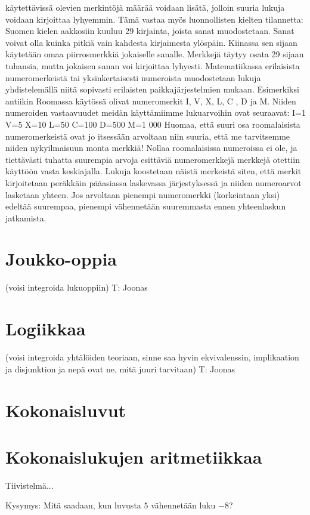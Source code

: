 käytettävissä olevien merkintöjä määrää voidaan lisätä, jolloin suuria lukuja voidaan kirjoittaa lyhyemmin. Tämä vastaa myös luonnollisten kielten tilannetta: Suomen kielen aakkosiin kuuluu 29 kirjainta, joista sanat muodostetaan. Sanat voivat olla kuinka pitkiä vain kahdesta kirjaimesta ylöspäin. Kiinassa sen sijaan käytetään omaa piirrosmerkkiä jokaiselle sanalle. Merkkejä täytyy osata 29 sijaan tuhansia, mutta jokaisen sanan voi kirjoittaa lyhyesti. 
Matematiikassa erilaisista numeromerkeistä tai yksinkertaisesti numeroista muodostetaan lukuja yhdistelemällä niitä sopivasti erilaisten paikkajärjestelmien mukaan. Esimerkiksi antiikin Roomassa käytössä olivat numeromerkit I, V, X, L, C , D ja M. Niiden numeroiden vastaavuudet meidän käyttämiimme lukuarvoihin ovat seuraavat:
I=1
V=5
X=10
L=50
C=100
D=500
M=1 000
Huomaa, että suuri osa roomalaisista numeromerkeistä ovat jo itsessään arvoltaan niin suuria, että me tarvitsemme niiden nykyilmaisuun monta merkkiä! Nollaa roomalaisissa numeroissa ei ole, ja tiettävästi tuhatta suurempia arvoja esittäviä numeromerkkejä merkkejä otettiin käyttöön vasta keskiajalla. 
Lukuja koostetaan näistä merkeistä siten, että merkit kirjoitetaan peräkkäin pääasiassa laskevassa järjestyksessä ja niiden numeroarvot lasketaan yhteen. Jos arvoltaan pienempi numeromerkki (korkeintaan yksi) edeltää suurempaa, pienempi vähennetään suuremmasta ennen yhteenlaskun jatkamista. 

\chapter{Joukko-oppia}

(voisi integroida lukuoppiin) T: Joonas
\chapter{Logiikkaa}

(voisi integroida yhtälöiden teoriaan, sinne saa hyvin ekvivalenssin, implikaation ja disjunktion ja nepä ovat ne, mitä juuri tarvitaan) T: Joonas
\chapter{Kokonaisluvut}
\chapter{Kokonaislukujen aritmetiikkaa}

Tiivistelmä...

Kysymys: Mitä saadaan, kun luvusta $5$ vähennetään luku $-8$?

